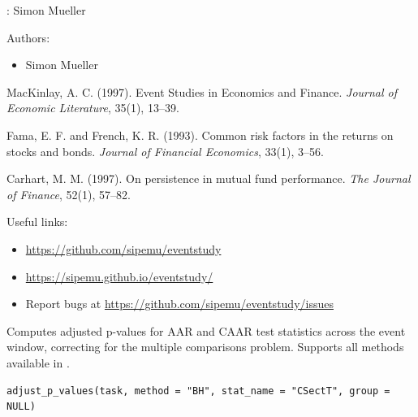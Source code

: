 \documentclass[a4paper]{book}
\begin{document}
%
\begin{Author}
: Simon Mueller 

Authors:
\begin{itemize}

\item{} Simon Mueller 

\end{itemize}


\end{Author}
%
\begin{References}
MacKinlay, A. C. (1997). Event Studies in Economics and Finance.
\emph{Journal of Economic Literature}, 35(1), 13--39.

Fama, E. F. and French, K. R. (1993). Common risk factors in the
returns on stocks and bonds. \emph{Journal of Financial Economics},
33(1), 3--56.

Carhart, M. M. (1997). On persistence in mutual fund performance.
\emph{The Journal of Finance}, 52(1), 57--82.
\end{References}
%
\begin{SeeAlso}
Useful links:
\begin{itemize}

\item{} \url{https://github.com/sipemu/eventstudy}
\item{} \url{https://sipemu.github.io/eventstudy/}
\item{} Report bugs at \url{https://github.com/sipemu/eventstudy/issues}

\end{itemize}


\end{SeeAlso}
%
\begin{Description}
Computes adjusted p-values for AAR and CAAR test statistics across the
event window, correcting for the multiple comparisons problem. Supports
all methods available in .
\end{Description}
%
\begin{Usage}
\begin{verbatim}
adjust_p_values(task, method = "BH", stat_name = "CSectT", group = NULL)
\end{verbatim}
\end{Usage}
%
\end{document}
